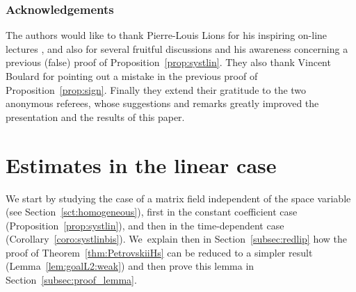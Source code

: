 \documentclass[JEP,XML,SOM,Unicode,published]{cedram}
\theoremstyle{definition}
\begin{document}
\subsubsection*{Acknowledgements}
The authors would like to thank Pierre-Louis Lions for his inspiring on-line lectures \cite{pilou}, and also for several fruitful discussions and his awareness concerning a previous (false) proof of Proposition~\ref{prop:systlin}. They also thank Vincent Boulard for pointing out a mistake in the previous proof of Proposition~\ref{prop:sign}. Finally they extend their gratitude to the two anonymous referees, whose suggestions and remarks greatly improved the presentation and the results of this paper.

\section{Estimates in the linear case}\label{sec:estimlin}

We start by studying the case of a matrix field independent of the space variable (see Section~\ref{sct:homogeneous}), first in the constant coefficient case (Proposition~\ref{prop:systlin}), and then in the time-dependent case (Corollary~\ref{coro:systlinbis}). We~explain then in Section~\ref{subsec:redlip} how the proof of Theorem~\ref{thm:PetrovskiiHs} can be reduced to a simpler result (Lemma~\ref{lem:goalL2:weak}) and then prove this lemma in Section~\ref{subsec:proof_lemma}.
\end{document}

